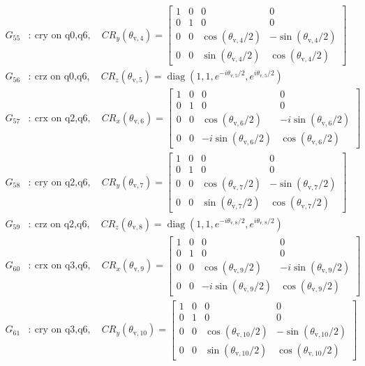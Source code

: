 \begin{align*}
G_{55}&:\ \text{cry on q0,q6},\quad CR_y(\theta_{\mathrm{v},4})=\begin{bmatrix}1&0&0&0\\0&1&0&0\\0&0&\cos(\theta_{\mathrm{v},4}/2)&-\sin(\theta_{\mathrm{v},4}/2)\\0&0&\sin(\theta_{\mathrm{v},4}/2)&\cos(\theta_{\mathrm{v},4}/2)\end{bmatrix}\\
G_{56}&:\ \text{crz on q0,q6},\quad CR_z(\theta_{\mathrm{v},5})=\operatorname{diag}(1,1,e^{-i\theta_{\mathrm{v},5}/2},e^{i\theta_{\mathrm{v},5}/2})\\
G_{57}&:\ \text{crx on q2,q6},\quad CR_x(\theta_{\mathrm{v},6})=\begin{bmatrix}1&0&0&0\\0&1&0&0\\0&0&\cos(\theta_{\mathrm{v},6}/2)&-i\sin(\theta_{\mathrm{v},6}/2)\\0&0&-i\sin(\theta_{\mathrm{v},6}/2)&\cos(\theta_{\mathrm{v},6}/2)\end{bmatrix}\\
G_{58}&:\ \text{cry on q2,q6},\quad CR_y(\theta_{\mathrm{v},7})=\begin{bmatrix}1&0&0&0\\0&1&0&0\\0&0&\cos(\theta_{\mathrm{v},7}/2)&-\sin(\theta_{\mathrm{v},7}/2)\\0&0&\sin(\theta_{\mathrm{v},7}/2)&\cos(\theta_{\mathrm{v},7}/2)\end{bmatrix}\\
G_{59}&:\ \text{crz on q2,q6},\quad CR_z(\theta_{\mathrm{v},8})=\operatorname{diag}(1,1,e^{-i\theta_{\mathrm{v},8}/2},e^{i\theta_{\mathrm{v},8}/2})\\
G_{60}&:\ \text{crx on q3,q6},\quad CR_x(\theta_{\mathrm{v},9})=\begin{bmatrix}1&0&0&0\\0&1&0&0\\0&0&\cos(\theta_{\mathrm{v},9}/2)&-i\sin(\theta_{\mathrm{v},9}/2)\\0&0&-i\sin(\theta_{\mathrm{v},9}/2)&\cos(\theta_{\mathrm{v},9}/2)\end{bmatrix}\\
G_{61}&:\ \text{cry on q3,q6},\quad CR_y(\theta_{\mathrm{v},10})=\begin{bmatrix}1&0&0&0\\0&1&0&0\\0&0&\cos(\theta_{\mathrm{v},10}/2)&-\sin(\theta_{\mathrm{v},10}/2)\\0&0&\sin(\theta_{\mathrm{v},10}/2)&\cos(\theta_{\mathrm{v},10}/2)\end{bmatrix}\\

\end{align*}
